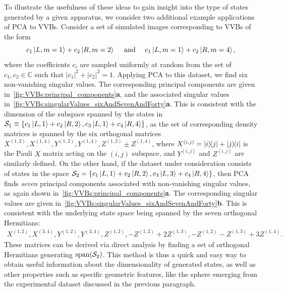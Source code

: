 To illustrate the usefulness of these ideas to gain insight into the type of states generated by a given apparatus, we consider two additional example applications of \ac{PCA} to VVBs.
Consider a set of simulated images corresponding to VVBs of the form
\begin{equation}
c_1\ket{L,m=1}+c_2\ket{R,m=2}
\quad\text{ and }\quad
c_1\ket{L,m=1}+c_2\ket{R,m=4},
\end{equation}
where the coefficients $c_i$ are sampled uniformly at random from the set of $c_{1},c_2\in\mathbb{C}$  such that $|c_1|^2+|c_2|^2=1$.
Applying PCA to this dataset, we find six non-vanishing singular values. The corresponding principal components are given in~\cref{fig:VVBs:principal_components}\textbf{a}, and the associated singular values in~\cref{fig:VVBs:singularValues_sixAndSevenAndForty}\textbf{a}.
This is consistent with the dimension of the subspace  spanned by the states in ${\mathcal{S}}_1\equiv\{c_1\ket{L,1}+c_2\ket{R,2}, c_3\ket{L,1}+c_4\ket{R,4}\}$,  as the set of corresponding density matrices is spanned by the six orthogonal matrices
$X^{(1,2)}, X^{(1,4)}, Y^{(1,2)},Y^{(1,4)},Z^{(1,2)}\pm Z^{(1,4)}$, where $X^{(i,j)}=\ketbra{i}{j}+\ketbra{j}{i}$ is the Pauli $X$ matrix acting on the $(i,j)$ subspace, and $Y^{(i,j)}$ and $Z^{(i,j)}$ are similarly defined.
On the other hand, if the dataset under consideration consists of states in the space $\mathcal S_2=\{c_1\ket{L,1}+c_2\ket{R,2}, c_3\ket{L,3}+c_4\ket{R,4}\}$, then \ac{PCA} finds \emph{seven} principal components associated with non-vanishing singular values, as again shown in~\cref{fig:VVBs:principal_components}\textbf{a}. The corresponding singular values are given in~\cref{fig:VVBs:singularValues_sixAndSevenAndForty}\textbf{b}.
This is consistent with the underlying state space being spanned by the seven orthogonal Hermitians:
\begin{equation}
\begin{gathered}
    X^{(1,2)}, X^{(3,4)},
    Y^{(1,2)}, Y^{(3,4)},
    Z^{(1,2)},
    -Z^{(1,2)} + 2 Z^{(1,3)},
    -Z^{(1,2)} - Z^{(1,3)} + 3 Z^{(1,4)}.
\end{gathered}
\end{equation}
These matrices can be derived via direct analysis by finding a set of orthogonal Hermitians generating $\operatorname{span}({\mathcal{S}}_2)$.
This method is thus a quick and easy way to obtain useful information about the dimensionality of generated states, as well as other properties such as specific geometric features, like the sphere emerging from the experimental dataset discussed in the previous paragraph.


